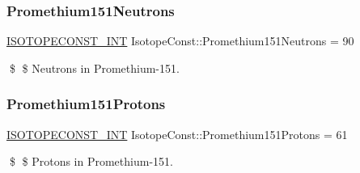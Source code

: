 \subsubsection{\texorpdfstring{Promethium151\+Neutrons}{Promethium151Neutrons}}
{\footnotesize\ttfamily \mbox{\hyperlink{group___isotope_const-_macros_ga5f18360b3e99483a35c32d789e62621c}{I\+S\+O\+T\+O\+P\+E\+C\+O\+N\+S\+T\+\_\+\+I\+NT}} Isotope\+Const\+::\+Promethium151\+Neutrons = 90}

\$ \$ Neutrons in Promethium-\/151. \mbox{\label{group___isotope_const-_promethium-_pm151_ga0a16e6a24cc0a7edbcaf29546572ce85}} 
\subsubsection{\texorpdfstring{Promethium151\+Protons}{Promethium151Protons}}
{\footnotesize\ttfamily \mbox{\hyperlink{group___isotope_const-_macros_ga5f18360b3e99483a35c32d789e62621c}{I\+S\+O\+T\+O\+P\+E\+C\+O\+N\+S\+T\+\_\+\+I\+NT}} Isotope\+Const\+::\+Promethium151\+Protons = 61}

\$ \$ Protons in Promethium-\/151. 